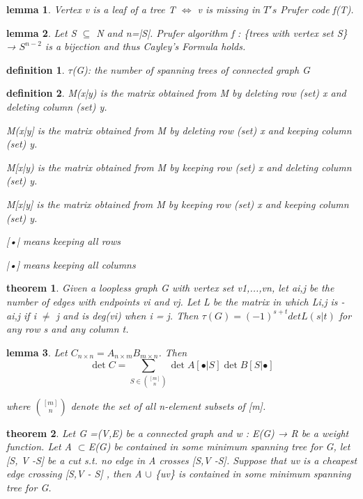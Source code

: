 \documentclass[2pt]{article}
\newtheorem{theorem}{theorem}[section]  %
\newtheorem{definition}{definition}
\newtheorem{lemma}{lemma}
\begin{document}
\begin{CJK*}{UTF8}{bkai}
\begin{paracol}{2}
    \begin{lemma}
        Vertex v is a leaf of a tree T $\iff$ v is missing in $T's$ Prufer code f(T).
    \end{lemma}

    \begin{lemma}
        Let S $\subseteq$ N and n=|S|. Prufer algorithm f : \{trees with vertex set S\} → $S^{n-2}$
 is a bijection and thus Cayley's Formula holds.
    \end{lemma}    

    \begin{definition}
         $\tau$(G): the number of spanning trees of connected graph G
    \end{definition}

    \begin{definition}
        M(x|y) is the matrix obtained from M by deleting row (set) x and deleting
 column (set) y.

 M(x|y] is the matrix obtained from M by deleting row (set) x and keeping
 column (set) y.

 M[x|y) is the matrix obtained from M by keeping row (set) x and deleting
 column (set) y.

 M[x|y] is the matrix obtained from M by keeping row (set) x and keeping
 column (set) y.

 [•| means keeping all rows
 
 |•] means keeping all columns
    \end{definition}

    \switchcolumn

    \begin{theorem}
        Given a loopless graph G with vertex set v1,...,vn, let ai,j be the number of
 edges with endpoints vi and vj. Let L be the matrix in which Li,j is -ai,j if
 i $\neq$ j and is deg(vi) when i = j. Then
 $\tau(G) = (-1)^{s+t}detL(s|t)$
 for any row s and any column t.
    \end{theorem}

    \begin{lemma} 
        Let \( C_{n \times n} = A_{n \times m} B_{m \times n} \). Then
        \[
        \det C = \sum_{S \in \binom{[m]}{n}} \det A[\bullet |S] \det B[S| \bullet]
        \]

        where $\binom{[m]}{n}$ denote the set of all n-element subsets of [m].
    \end{lemma}

    \begin{theorem}
        Let G =(V,E) be a connected graph and w : E(G) → R be a weight function.
 Let A $\subset$E(G) be contained in some minimum spanning tree for G, let
 [S, V -S] be a cut s.t. no edge in A crosses [S,V -S]. Suppose that uv is a
 cheapest edge crossing [S,V - S] , then A $\cup$ \{uv\} is contained in some
 minimum spanning tree for G.
    \end{theorem}


\end{paracol}
\end{CJK*}
\end{document}
